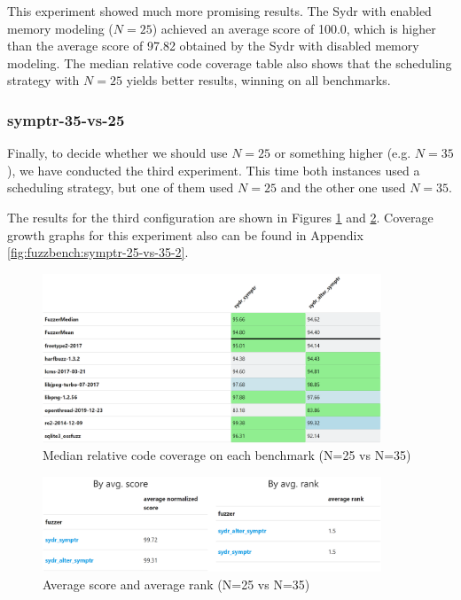 This experiment showed much more promising results. The Sydr with enabled memory modeling ($N=25$) achieved an average score of 100.0, which is higher than the average score of 97.82 obtained by the Sydr with disabled memory modeling. The median relative code coverage table also shows that the scheduling strategy with $N=25$ yields better results, winning on all benchmarks.

\subsubsection{symptr-35-vs-25}

Finally, to decide whether we should use $ N = 25 $ or something higher (e.g. $ N = 35 $), we have conducted the third experiment. This time both instances used a scheduling strategy, but one of them used $ N = 25 $ and the other one used $ N = 35 $.

The results for the third configuration are shown in Figures \ref{fig:fuzzbench-symptr-25-vs-35-2-coverage} and \ref{fig:fuzzbench-symptr-25-vs-35-2-score-rank}. Coverage growth graphs for this experiment also can be found in Appendix \ref{fig:fuzzbench:symptr-25-vs-35-2}.

\begin{figure}[h]
    \centering
    \includegraphics[width=0.9\textwidth]{assets/fuzzbench/symptr-25-vs-35-2/median-relative-code-coverage-on-each-benchmark.png}
    \caption{Median relative code coverage on each benchmark (N=25 vs N=35)}
    \label{fig:fuzzbench-symptr-25-vs-35-2-coverage}
\end{figure}

\begin{figure}[h]
    \centering
    \includegraphics[width=0.9\textwidth]{assets/fuzzbench/symptr-25-vs-35-2/avg-score-avg-rank.png}
    \caption{Average score and average rank (N=25 vs N=35)}
    \label{fig:fuzzbench-symptr-25-vs-35-2-score-rank}
\end{figure}

